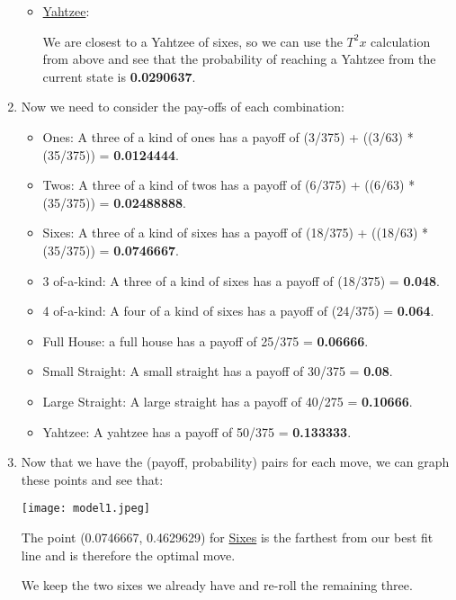 \documentclass[12pt,a4paper]{article}
\begin{document}
\begin{enumerate}
\begin{itemize}
    \item \underline{Yahtzee}:

    We are closest to a Yahtzee of sixes, so we can use the $T^2 x$ calculation from above and see that the probability of reaching a Yahtzee from the current state is \textbf{0.0290637}.

    \end{itemize}

    \item Now we need to consider the pay-offs of each combination:

    \begin{itemize}
        \item Ones: A three of a kind of ones has a payoff of (3/375) + ((3/63) * (35/375)) = \textbf{0.0124444}.
        \item Twos: A three of a kind of twos has a payoff of (6/375) + ((6/63) * (35/375)) = \textbf{0.02488888}.
        \item Sixes: A three of a kind of sixes has a payoff of (18/375) + ((18/63) * (35/375)) = \textbf{0.0746667}.
        \item 3 of-a-kind: A three of a kind of sixes has a payoff of (18/375) = \textbf{0.048}.
        \item 4 of-a-kind: A four of a kind of sixes has a payoff of (24/375) = \textbf{0.064}.
        \item Full House: a full house has a payoff of 25/375 = \textbf{0.06666}.
        \item Small Straight: A small straight has a payoff of 30/375 = \textbf{0.08}.
        \item Large Straight: A large straight has a payoff of 40/275 = \textbf{0.10666}.
        \item Yahtzee: A yahtzee has a payoff of 50/375 = \textbf{0.133333}.
    \end{itemize}

    \item Now that we have the (payoff, probability) pairs for each move, we can graph these points and see that:

    \begin{center}
    \texttt{[image: model1.jpeg]}
    \end{center}

    The point (0.0746667, 0.4629629) for \underline{Sixes} is the farthest from our best fit line and is therefore the optimal move.

    We keep the two sixes we already have and re-roll the remaining three.

    \vspace{5mm}
\end{enumerate}
\end{document}
